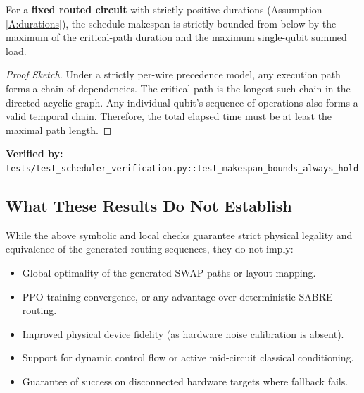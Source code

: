 \begin{lemma}
For a \textbf{fixed routed circuit} with strictly positive durations (Assumption \ref{A:durations}), the schedule makespan is strictly bounded from below by the maximum of the critical-path duration and the maximum single-qubit summed load.
\end{lemma}
\begin{proof}[Proof Sketch]
Under a strictly per-wire precedence model, any execution path forms a chain of dependencies. The critical path is the longest such chain in the directed acyclic graph. Any individual qubit's sequence of operations also forms a valid temporal chain. Therefore, the total elapsed time must be at least the maximal path length.
\end{proof}
\noindent \textbf{Verified by:} \texttt{tests/test\_scheduler\_verification.py::test\_makespan\_bounds\_always\_hold}

\subsection{What These Results Do Not Establish}
While the above symbolic and local checks guarantee strict physical legality and equivalence of the generated routing sequences, they do not imply:
\begin{itemize}
    \item Global optimality of the generated SWAP paths or layout mapping.
    \item PPO training convergence, or any advantage over deterministic SABRE routing.
    \item Improved physical device fidelity (as hardware noise calibration is absent).
    \item Support for dynamic control flow or active mid-circuit classical conditioning.
    \item Guarantee of success on disconnected hardware targets where fallback fails.
\end{itemize}
